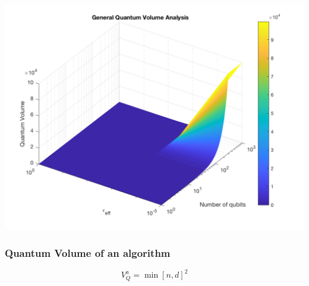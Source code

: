 \documentclass[11pt]{article}
\begin{document}
\begin{minipage}{.45\textwidth}

\begin{center}
\includegraphics[width=.9\linewidth]{general_QV1.png}
\end{center}

\label{fig:deviceQV1}

\end{minipage}%

\subsubsection{Quantum Volume of an algorithm}
\label{sec:org650ba73}



$$V_Q^a = \min \left[ n,d \right]^2$$

\end{document}

